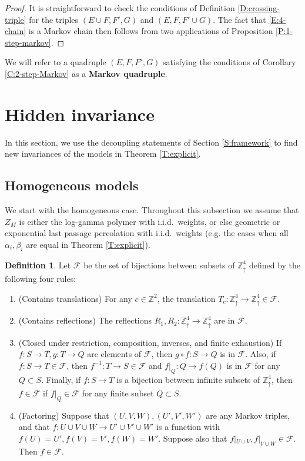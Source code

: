 \documentclass[aop, preprint]{imsart}
\theoremstyle{plain}
\theoremstyle{definition}
\newtheorem{definition}[theorem]{Definition}
\theoremstyle{plain}
\newcommand{\sset}{\subset}
\newcommand{\al}{\alpha}
\newcommand{\be}{\beta}
\newcommand{\Zd}{\mathds{Z}^4_\uparrow}
\newcommand{\scrF}{\mathcal{F}}
\newcommand{\Z}{\mathds{Z}}
\begin{document}
\begin{proof}
	It is straightforward to check the conditions of Definition \ref{D:crossing-triple} for the triples $(E \cup F, F', G)$ and $(E, F, F' \cup G)$. The fact that \eqref{E:4-chain} is a Markov chain then follows from two applications of Proposition \ref{P:1-step-markov}.
\end{proof}

We will refer to a quadruple $(E, F, F', G)$ satisfying the conditions of Corollary \ref{C:2-step-Markov} as a \textbf{Markov quadruple}.

\section{Hidden invariance}
\label{S:main}

In this section, we use the decoupling statements of Section \ref{S:framework} to find new invariances of the models in Theorem \ref{T:explicit}.

\subsection{Homogeneous models}
\label{SS:homog}
We start with the homogeneous case. Throughout this subsection we assume that $Z_M$ is either the log-gamma polymer with i.i.d.\ weights, or else geometric or exponential last passage percolation with i.i.d.\ weights
(e.g. the cases when all $\al_i, \be_i$ are equal in Theorem \ref{T:explicit}).

\begin{definition}
	\label{D:scrF}
	Let $\scrF$ be the set of bijections between subsets of $\Zd$ defined by the following four rules: 
	\begin{enumerate}[nosep, label=(\roman*)]
		\item (Contains translations) For any $c \in \Z^2$, the translation $T_c:\Zd \to \Zd \in \scrF$.
		\item (Contains reflections) The reflections $R_1, R_2:\Zd \to \Zd$ are in $\scrF$.
		\item (Closed under restriction, composition, inverses, and finite exhaustion) If $f:S \to T, g:T \to Q$ are elements of $\scrF$, then $g \circ f:S \to Q$ is in $\scrF$. Also, if $f:S \to T \in \scrF$, then $f^{-1}:T \to S \in \scrF$ and $f|_{Q}:Q \to f(Q)$ is in $\scrF$ for any $Q \sset S$. Finally, if $f:S \to T$ is a bijection between infinite subsets of $\Zd$, then $f \in \scrF$ if $f|_{Q} \in \scrF$ for any finite subset $Q \sset S$. 
		\item (Factoring) Suppose that $(U, V, W), (U', V', W')$ are any Markov triples, and that $f:U \cup V \cup W \to U' \cup V' \cup W'$ is a function with $f(U) = U', f(V) = V', f(W) = W'$. Suppose also that $f|_{U \cup V}, f|_{V \cup W} \in \scrF$. Then $f \in \scrF$.
	\end{enumerate} 
\end{definition}
\end{document}
